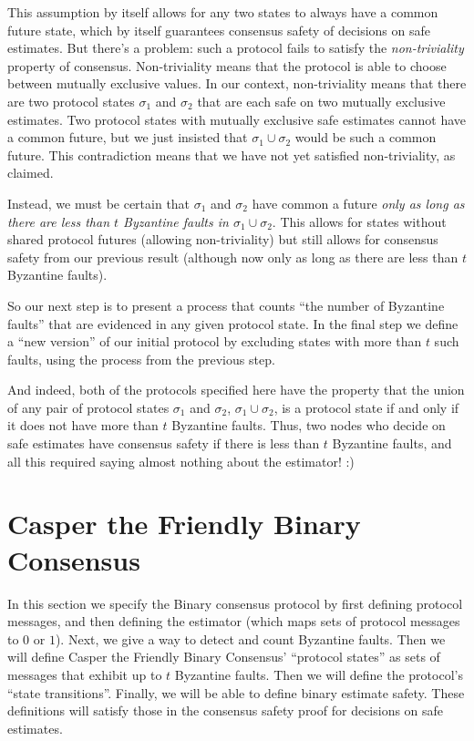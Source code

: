 \documentclass{article}
\theoremstyle{definition}
\begin{document}
This assumption by itself allows for any two states to always have a common future state, which by itself guarantees consensus safety of decisions on safe estimates. But there's a problem: such a protocol fails to satisfy the \emph{non-triviality} property of consensus. Non-triviality means that the protocol is able to choose between mutually exclusive values. In our context, non-triviality means that there are two protocol states $\sigma_1$ and $\sigma_2$ that are each safe on two mutually exclusive estimates. Two protocol states with mutually exclusive safe estimates cannot have a common future, but we just insisted that $\sigma_1 \cup \sigma_2$ would be such a common future. This contradiction means that we have not yet satisfied non-triviality, as claimed.

Instead, we must be certain that $\sigma_1$ and $\sigma_2$ have common a future \emph{only as long as there are less than $t$ Byzantine faults in $\sigma_1 \cup \sigma_2$}. This allows for states without shared protocol futures (allowing non-triviality) but still allows for consensus safety from our previous result (although now only as long as there are less than $t$ Byzantine faults).

So our next step is to present a process that counts ``the number of Byzantine faults'' that are evidenced in any given protocol state. In the final step we define a ``new version'' of our initial protocol by excluding states with more than $t$ such faults, using the process from the previous step.

And indeed, both of the protocols specified here have the property that the union of any pair of protocol states $\sigma_1$ and $\sigma_2$, $\sigma_1 \cup \sigma_2$, is a protocol state if and only if it does not have more than $t$ Byzantine faults. Thus, two nodes who decide on safe estimates have consensus safety if there is less than $t$ Byzantine faults, and all this required saying almost nothing about the estimator! :)



\section{Casper the Friendly Binary Consensus}

In this section we specify the Binary consensus protocol by first defining protocol messages, and then defining the estimator (which maps sets of protocol messages to $0$ or $1$). Next, we give a way to detect and count Byzantine faults. Then we will define Casper the Friendly Binary Consensus' ``protocol states'' as sets of messages that exhibit up to $t$ Byzantine faults. Then we will define the protocol's ``state transitions''. Finally, we will be able to define binary estimate safety.  These definitions will satisfy those in the consensus safety proof for decisions on safe estimates.
\end{document}
